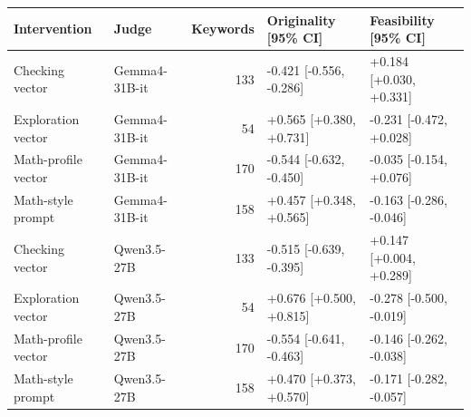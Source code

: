 \begin{tabular}{llrll}
\toprule Intervention & Judge & Keywords & Originality [95\% CI] & Feasibility [95\% CI] \\
\midrule
Checking vector & Gemma4-31B-it & 133 & -0.421 [-0.556, -0.286] & +0.184 [+0.030, +0.331] \\
Exploration vector & Gemma4-31B-it & 54 & +0.565 [+0.380, +0.731] & -0.231 [-0.472, +0.028] \\
Math-profile vector & Gemma4-31B-it & 170 & -0.544 [-0.632, -0.450] & -0.035 [-0.154, +0.076] \\
Math-style prompt & Gemma4-31B-it & 158 & +0.457 [+0.348, +0.565] & -0.163 [-0.286, -0.046] \\
Checking vector & Qwen3.5-27B & 133 & -0.515 [-0.639, -0.395] & +0.147 [+0.004, +0.289] \\
Exploration vector & Qwen3.5-27B & 54 & +0.676 [+0.500, +0.815] & -0.278 [-0.500, -0.019] \\
Math-profile vector & Qwen3.5-27B & 170 & -0.554 [-0.641, -0.463] & -0.146 [-0.262, -0.038] \\
Math-style prompt & Qwen3.5-27B & 158 & +0.470 [+0.373, +0.570] & -0.171 [-0.282, -0.057] \\
\bottomrule
\end{tabular}
